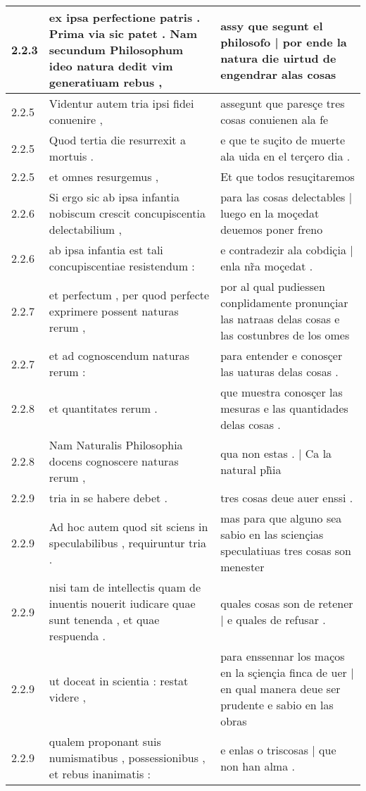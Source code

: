 \begin{tabular}{|p{1cm}|p{6.5cm}|p{6.5cm}|}
2.2.3 & ex ipsa perfectione patris . Prima via sic patet . Nam secundum Philosophum ideo natura dedit vim generatiuam rebus , & assy que segunt el philosofo | por ende la natura die uirtud de engendrar alas cosas \\\hline
2.2.5 & Videntur autem tria ipsi fidei conuenire , & assegunt que paresçe tres cosas conuienen ala fe \\\hline
2.2.5 & Quod tertia die resurrexit a mortuis . & e que te suçito de muerte ala uida en el terçero dia . \\\hline
2.2.5 & et omnes resurgemus , & Et que todos resuçitaremos \\\hline
2.2.6 & Si ergo sic ab ipsa infantia nobiscum crescit concupiscentia delectabilium , & para las cosas delectables | luego en la moçedat deuemos poner freno \\\hline
2.2.6 & ab ipsa infantia est tali concupiscentiae resistendum : & e contradezir ala cobdiçia | enla nr̃a moçedat . \\\hline
2.2.7 & et perfectum , per quod perfecte exprimere possent naturas rerum , & por al qual pudiessen conplidamente pronunçiar las natraas delas cosas e las costunbres de los omes \\\hline
2.2.7 & et ad cognoscendum naturas rerum : & para entender e conosçer las uaturas delas cosas . \\\hline
2.2.8 & et quantitates rerum . & que muestra conosçer las mesuras e las quantidades delas cosas . \\\hline
2.2.8 & Nam Naturalis Philosophia docens cognoscere naturas rerum , & qua non estas . | Ca la natural ph̃ia \\\hline
2.2.9 & tria in se habere debet . & tres cosas deue auer enssi . \\\hline
2.2.9 & Ad hoc autem quod sit sciens in speculabilibus , requiruntur tria . & mas para que alguno sea sabio en las sciençias speculatiuas tres cosas son menester \\\hline
2.2.9 & nisi tam de intellectis quam de inuentis nouerit iudicare quae sunt tenenda , et quae respuenda . & quales cosas son de retener | e quales de refusar . \\\hline
2.2.9 & ut doceat in scientia : restat videre , & para enssennar los maços en la sçiençia finca de uer | en qual manera deue ser prudente e sabio en las obras \\\hline
2.2.9 & qualem proponant suis numismatibus , possessionibus , et rebus inanimatis : & e enlas o triscosas | que non han alma . \\\hline

\end{tabular}
